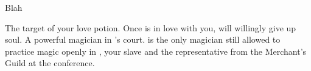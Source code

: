 \documentclass[char]{NeptuneBall}
\begin{document}
\begin{itemz}[Goals]
  \item Blah
\end{itemz}

\begin{contacts}
  \contact{\cKing{}} The target of your love potion. Once \cKing{\they} is in love with you, \cKing{\they} will willingly give up \cKing{\them} soul.
  \contact{\cManta{}} A powerful magician in \cKing{}'s court. \cManta{\They} is the only magician still allowed to practice magic openly in \pAtlantis{}
  \contact{\cSlave{\MYname}} \cSlave{}, your slave and the representative from the Merchant's Guild at the conference.
\end{contacts}
\end{document}

